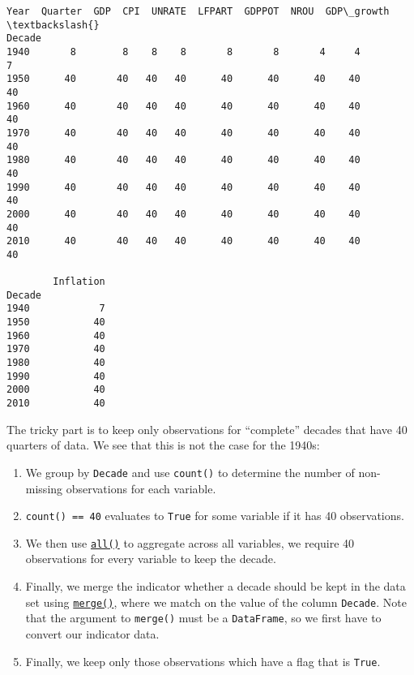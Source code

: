 \documentclass{scrartcl}
\providecommand{\tightlist}{%
      \setlength{\itemsep}{0pt}\setlength{\parskip}{0pt}}
\begin{document}
    \begin{Verbatim}[commandchars=\\\{\}]
        Year  Quarter  GDP  CPI  UNRATE  LFPART  GDPPOT  NROU  GDP\_growth  \textbackslash{}
Decade
1940       8        8    8    8       8       8       4     4           7
1950      40       40   40   40      40      40      40    40          40
1960      40       40   40   40      40      40      40    40          40
1970      40       40   40   40      40      40      40    40          40
1980      40       40   40   40      40      40      40    40          40
1990      40       40   40   40      40      40      40    40          40
2000      40       40   40   40      40      40      40    40          40
2010      40       40   40   40      40      40      40    40          40

        Inflation
Decade
1940            7
1950           40
1960           40
1970           40
1980           40
1990           40
2000           40
2010           40
    \end{Verbatim}

    The tricky part is to keep only observations for ``complete'' decades
that have 40 quarters of data. We see that this is not the case for the
1940s:

\begin{enumerate}
\def\labelenumi{\arabic{enumi}.}
\tightlist
\item
  We group by \texttt{Decade} and use \texttt{count()} to determine the
  number of non-missing observations for each variable.
\item
  \texttt{count()\ ==\ 40} evaluates to \texttt{True} for some variable
  if it has 40 observations.
\item
  We then use
  \href{https://pandas.pydata.org/pandas-docs/stable/reference/api/pandas.DataFrame.all.html}{\texttt{all()}}
  to aggregate across all variables, \ie we require 40 observations for
  every variable to keep the decade.
\item
  Finally, we merge the indicator whether a decade should be kept in the
  data set using
  \href{https://pandas.pydata.org/pandas-docs/stable/reference/api/pandas.DataFrame.merge.html}{\texttt{merge()}},
  where we match on the value of the column \texttt{Decade}. Note that
  the argument to \texttt{merge()} must be a \texttt{DataFrame}, so we
  first have to convert our indicator data.
\item
  Finally, we keep only those observations which have a flag that is
  \texttt{True}.
\end{enumerate}
\end{document}

